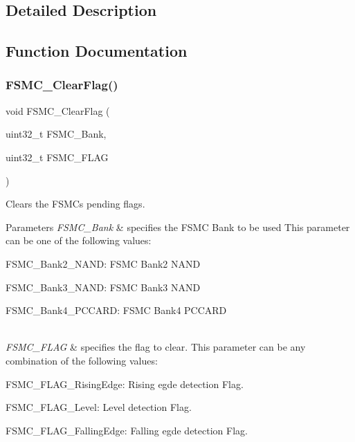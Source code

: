 \subsection{Detailed Description}


\subsection{Function Documentation}
\mbox{\label{group___f_s_m_c___private___functions_ga697618f2de0ad9a8a82461ddbebd5264}} 
\subsubsection{\texorpdfstring{F\+S\+M\+C\+\_\+\+Clear\+Flag()}{FSMC\_ClearFlag()}}
{\footnotesize\ttfamily void F\+S\+M\+C\+\_\+\+Clear\+Flag (\begin{DoxyParamCaption}\item[{uint32\+\_\+t}]{F\+S\+M\+C\+\_\+\+Bank,  }\item[{uint32\+\_\+t}]{F\+S\+M\+C\+\_\+\+F\+L\+AG }\end{DoxyParamCaption})}



Clears the F\+S\+MC\textquotesingle{}s pending flags. 


\begin{DoxyParams}{Parameters}
{\em F\+S\+M\+C\+\_\+\+Bank} & specifies the F\+S\+MC Bank to be used This parameter can be one of the following values\+: \begin{DoxyItemize}
\item F\+S\+M\+C\+\_\+\+Bank2\+\_\+\+N\+A\+ND\+: F\+S\+MC Bank2 N\+A\+ND \item F\+S\+M\+C\+\_\+\+Bank3\+\_\+\+N\+A\+ND\+: F\+S\+MC Bank3 N\+A\+ND \item F\+S\+M\+C\+\_\+\+Bank4\+\_\+\+P\+C\+C\+A\+RD\+: F\+S\+MC Bank4 P\+C\+C\+A\+RD \end{DoxyItemize}
\\
\hline
{\em F\+S\+M\+C\+\_\+\+F\+L\+AG} & specifies the flag to clear. This parameter can be any combination of the following values\+: \begin{DoxyItemize}
\item F\+S\+M\+C\+\_\+\+F\+L\+A\+G\+\_\+\+Rising\+Edge\+: Rising egde detection Flag. \item F\+S\+M\+C\+\_\+\+F\+L\+A\+G\+\_\+\+Level\+: Level detection Flag. \item F\+S\+M\+C\+\_\+\+F\+L\+A\+G\+\_\+\+Falling\+Edge\+: Falling egde detection Flag. \end{DoxyItemize}
\\
\hline
\end{DoxyParams}


